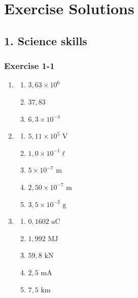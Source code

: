 \chapter{Exercise Solutions}

\section{1. Science skills}

\subsection{Exercise 1-1} 
\begin{multicols}{3}
\begin{enumerate}[noitemsep, label=\textbf{\arabic*}. ] 
\item %
  \begin{enumerate}[itemsep=5pt, label=\textbf{(\alph*)} ] 
    \item $3,63 \times 10^6$
    \item $37,83$
    \item $6,3 \times 10^{−4}$
    \end{enumerate}
\item %
    \begin{enumerate}[itemsep=5pt, label=\textbf{(\alph*)} ] 
    \item $5,11 \times 10^{5} \text{ V}$
    \item $1,0 \times 10^{-1} \ell$
    \item $5 \times 10^{-7} \text{ m}$
    \item $2,50 \times 10^{-7} \text{ m}$
    \item $3,5 \times 10^{-2} \text{ g}$
    \end{enumerate}
 \item %
    \begin{enumerate}[itemsep=5pt, label=\textbf{(\alph*)} ] 
    \item $0,1602 \text{ aC}$
    \item $1,992 \text{ MJ}$
    \item $59,8 \text{ kN}$
    \item $2,5 \text{ mA}$
    \item $7,5 \text{ km}$
    \end{enumerate}
\end{enumerate}
\end{multicols}
